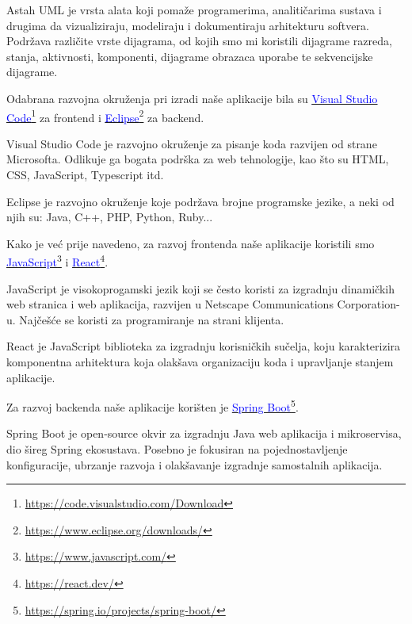 Astah UML je vrsta alata koji pomaže programerima, analitičarima sustava i drugima da vizualiziraju, modeliraju i dokumentiraju arhitekturu softvera. Podržava različite vrste dijagrama, od kojih smo mi koristili dijagrame razreda, stanja, aktivnosti, komponenti, dijagrame obrazaca uporabe te sekvencijske dijagrame.

Odabrana razvojna okruženja pri izradi naše aplikacije bila su \textcolor{blue}{\underline{\href{https://code.visualstudio.com/Download}{\textcolor{blue}{Visual Studio Code}}}}\footnote{\url{https://code.visualstudio.com/Download}} za frontend i \textcolor{blue}{\underline{\href{https://www.eclipse.org/downloads/}{\textcolor{blue}{Eclipse}}}}\footnote{\url{https://www.eclipse.org/downloads/}} za backend.


Visual Studio Code je razvojno okruženje za pisanje koda razvijen od strane Microsofta. Odlikuje ga bogata podrška za web tehnologije, kao što su HTML, CSS, JavaScript, Typescript itd.

Eclipse je razvojno okruženje koje podržava brojne programske jezike, a neki od njih su: Java, C++, PHP, Python, Ruby...

Kako je već prije navedeno, za razvoj frontenda naše aplikacije koristili smo \textcolor{blue}{\underline{\href{https://www.javascript.com/}{\textcolor{blue}{JavaScript}}}}\footnote{\url{https://www.javascript.com/}} i \textcolor{blue}{\underline{\href{https://react.dev/}{\textcolor{blue}{React}}}}\footnote{\url{https://react.dev/}}.

JavaScript je visokoprogamski jezik koji se često koristi za izgradnju dinamičkih web stranica i web aplikacija, razvijen u Netscape Communications Corporation-u. Najčešće se koristi za programiranje na strani klijenta.

React je JavaScript biblioteka za izgradnju korisničkih sučelja, koju karakterizira komponentna arhitektura koja olakšava organizaciju koda i upravljanje stanjem aplikacije.

Za razvoj backenda naše aplikacije korišten je \textcolor{blue}{\underline{\href{https://spring.io/projects/spring-boot/}{\textcolor{blue}{Spring Boot}}}}\footnote{\url{https://spring.io/projects/spring-boot/}}.

Spring Boot je open-source okvir za izgradnju Java web aplikacija i mikroservisa, dio šireg Spring ekosustava. Posebno je fokusiran na pojednostavljenje konfiguracije, ubrzanje razvoja i olakšavanje izgradnje samostalnih aplikacija.


			\eject 
			
